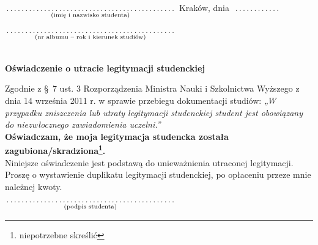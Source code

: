 \documentclass[a4paper,11pt]{article}
\newcommand{\fillField}[2]{
    $\underset{\text{#1}}{\parbox[t]{#2}{\dotfill}}$
}
\begin{document}
\noindent
\fillField{(imię i nazwisko studenta)}{7cm} \hfill Kraków, dnia \fillField{}{2cm} \\\\
\fillField{(nr albumu – rok i kierunek studiów)}{7cm} \\\\

\vskip 1.0cm
\begin{center}
{\Large \textbf{Oświadczenie o utracie legitymacji studenckiej}}
\end{center}
\vskip 0.5cm

Zgodnie z \S ~7 ust. 3 Rozporządzenia Ministra Nauki i Szkolnictwa Wyższego z dnia 14 września 2011 r. w sprawie przebiegu dokumentacji studiów: \textit{„W przypadku zniszczenia lub utraty legitymacji studenckiej student jest obowiązany do niezwłocznego zawiadomienia uczelni.”} \\

\noindent
\textbf{Oświadczam, że moja legitymacja studencka została zagubiona/skradziona\footnote[1]{niepotrzebne skreślić}.} \\

\noindent
Niniejsze oświadczenie jest podstawą do unieważnienia utraconej legitymacji. \\

\noindent
Proszę o wystawienie duplikatu legitymacji studenckiej, po opłaceniu przeze mnie należnej kwoty.

\vskip 1.2cm
\hspace{\fill} \fillField{(podpis studenta)}{7cm} \hspace{2.0cm}
\end{document}

